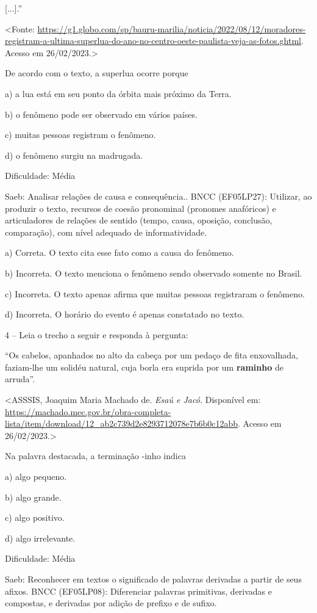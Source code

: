 {[}...{]}.''

\textless{}Fonte:
\url{https://g1.globo.com/sp/bauru-marilia/noticia/2022/08/12/moradores-registram-a-ultima-superlua-do-ano-no-centro-oeste-paulista-veja-as-fotos.ghtml}.
Acesso em 26/02/2023.\textgreater{}

De acordo com o texto, a superlua ocorre porque

a) a lua está em seu ponto da órbita mais próximo da Terra.

b) o fenômeno pode ser observado em vários países.

c) muitas pessoas registram o fenômeno.

d) o fenômeno surgiu na madrugada.

Dificuldade: Média

Saeb: Analisar relações de causa e consequência.. BNCC (EF05LP27):
Utilizar, ao produzir o texto, recursos de coesão pronominal (pronomes
anafóricos) e articuladores de relações de sentido (tempo, causa,
oposição, conclusão, comparação), com nível adequado de informatividade.

a) Correta. O texto cita esse fato como a causa do fenômeno.

b) Incorreta. O texto menciona o fenômeno sendo observado somente no
Brasil.

c) Incorreta. O texto apenas afirma que muitas pessoas registraram o
fenômeno.

d) Incorreta. O horário do evento é apenas constatado no texto.

4 -- Leia o trecho a seguir e responda à pergunta:

``Os cabelos, apanhados no alto da cabeça por um pedaço de fita
enxovalhada, faziam-lhe um solidéu natural, cuja borla era suprida por
um \textbf{raminho} de arruda''.

\textless{}ASSSIS, Joaquim Maria Machado de. \emph{Esaú e Jacó.}
Disponível em:
\url{https://machado.mec.gov.br/obra-completa-lista/item/download/12_ab2c739d2e8293712078e7b6b0c12abb}.
Acesso em 26/02/2023.\textgreater{}

Na palavra destacada, a terminação -inho indica

a) algo pequeno.

b) algo grande.

c) algo positivo.

d) algo irrelevante.

Dificuldade: Média

Saeb: Reconhecer em textos o significado de palavras derivadas a partir
de seus afixos. BNCC (EF05LP08): Diferenciar palavras primitivas,
derivadas e compostas, e derivadas por adição de prefixo e de sufixo.

